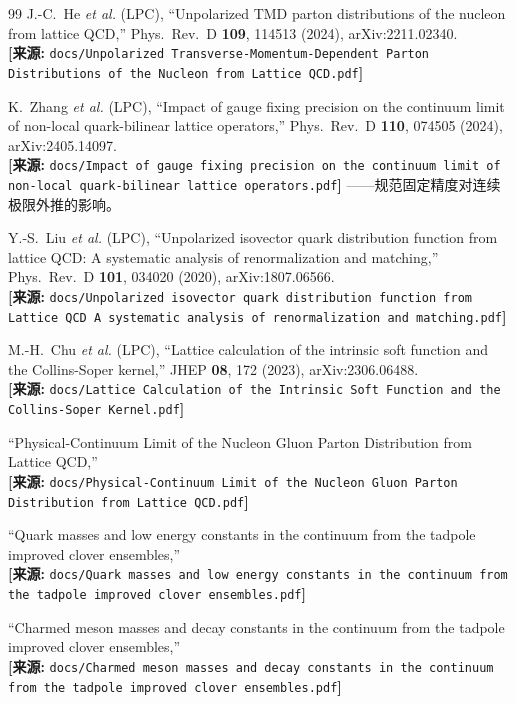 \documentclass[12pt,a4paper]{ctexart}
\theoremstyle{definition}
\begin{document}
\begin{thebibliography}{99}
J.-C.~He \textit{et al.} (LPC),
``Unpolarized TMD parton distributions of the nucleon from lattice QCD,''
Phys.\ Rev.\ D \textbf{109}, 114513 (2024), arXiv:2211.02340.
\\\textbf{[来源:} \texttt{docs/Unpolarized Transverse-Momentum-Dependent Parton Distributions of the Nucleon from Lattice QCD.pdf}\textbf{]}

K.~Zhang \textit{et al.} (LPC),
``Impact of gauge fixing precision on the continuum limit of non-local quark-bilinear lattice operators,''
Phys.\ Rev.\ D \textbf{110}, 074505 (2024), arXiv:2405.14097.
\\\textbf{[来源:} \texttt{docs/Impact of gauge fixing precision on the continuum limit of non-local quark-bilinear lattice operators.pdf}\textbf{]}
——规范固定精度对连续极限外推的影响。

Y.-S.~Liu \textit{et al.} (LPC),
``Unpolarized isovector quark distribution function from lattice QCD: A systematic analysis of renormalization and matching,''
Phys.\ Rev.\ D \textbf{101}, 034020 (2020), arXiv:1807.06566.
\\\textbf{[来源:} \texttt{docs/Unpolarized isovector quark distribution function from Lattice QCD A systematic analysis of renormalization and matching.pdf}\textbf{]}

M.-H.~Chu \textit{et al.} (LPC),
``Lattice calculation of the intrinsic soft function and the Collins-Soper kernel,''
JHEP \textbf{08}, 172 (2023), arXiv:2306.06488.
\\\textbf{[来源:} \texttt{docs/Lattice Calculation of the Intrinsic Soft Function and the Collins-Soper Kernel.pdf}\textbf{]}

``Physical-Continuum Limit of the Nucleon Gluon Parton Distribution from Lattice QCD,''
\\\textbf{[来源:} \texttt{docs/Physical-Continuum Limit of the Nucleon Gluon Parton Distribution from Lattice QCD.pdf}\textbf{]}

``Quark masses and low energy constants in the continuum from the tadpole improved clover ensembles,''
\\\textbf{[来源:} \texttt{docs/Quark masses and low energy constants in the continuum from the tadpole improved clover ensembles.pdf}\textbf{]}

``Charmed meson masses and decay constants in the continuum from the tadpole improved clover ensembles,''
\\\textbf{[来源:} \texttt{docs/Charmed meson masses and decay constants in the continuum from the tadpole improved clover ensembles.pdf}\textbf{]}


\end{thebibliography}
\end{document}
